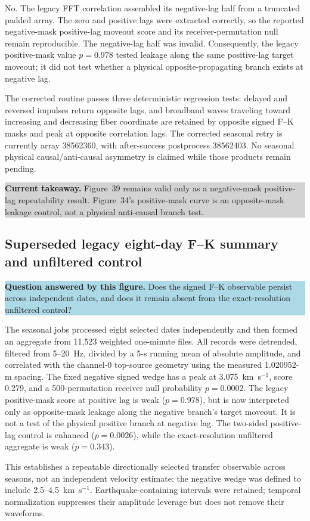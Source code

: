 \documentclass[11pt]{article}
\newcommand{\figquestion}[1]{\par\medskip\noindent\colorbox{lightblue}{\parbox{0.95\linewidth}{\textcolor{questionblue}{\textbf{Question answered by this figure.}} #1}}\par\medskip}
\newcommand{\takeaway}[1]{\par\smallskip\noindent\colorbox{lightgray}{\parbox{0.95\linewidth}{\textbf{Current takeaway.} #1}}\par\medskip}
\begin{document}
No. The legacy FFT correlation assembled its negative-lag half from a truncated padded array. The zero and positive lags were extracted correctly, so the reported negative-mask positive-lag moveout score and its receiver-permutation null remain reproducible. The negative-lag half was invalid. Consequently, the legacy positive-mask value $p=0.978$ tested leakage along the same positive-lag target moveout; it did not test whether a physical opposite-propagating branch exists at negative lag.

The corrected routine passes three deterministic regression tests: delayed and reversed impulses return opposite lags, and broadband waves traveling toward increasing and decreasing fiber coordinate are retained by opposite signed F--K masks and peak at opposite correlation lags. The corrected seasonal retry is currently array 38562360, with after-success postprocess 38562403. No seasonal physical causal/anti-causal asymmetry is claimed while those products remain pending.

\takeaway{Figure~39 remains valid only as a negative-mask positive-lag repeatability result. Figure~34's positive-mask curve is an opposite-mask leakage control, not a physical anti-causal branch test.}


\subsection{Superseded legacy eight-day F--K summary and unfiltered control}
\figquestion{Does the signed F--K observable persist across independent dates, and does it remain absent from the exact-resolution unfiltered control?}

The seasonal jobs processed eight selected dates independently and then formed an aggregate from 11,523 weighted one-minute files. All records were detrended, filtered from 5--20~Hz, divided by a 5-s running mean of absolute amplitude, and correlated with the channel-0 top-source geometry using the measured 1.020952-m spacing. The fixed negative signed wedge has a peak at 3.075~km~s$^{-1}$, score 0.279, and a 500-permutation receiver null probability $p=0.0002$. The legacy positive-mask score at positive lag is weak ($p=0.978$), but is now interpreted only as opposite-mask leakage along the negative branch's target moveout. It is not a test of the physical positive branch at negative lag. The two-sided positive-lag control is enhanced ($p=0.0026$), while the exact-resolution unfiltered aggregate is weak ($p=0.343$).

This establishes a repeatable directionally selected transfer observable across seasons, not an independent velocity estimate: the negative wedge was defined to include 2.5--4.5~km~s$^{-1}$. Earthquake-containing intervals were retained; temporal normalization suppresses their amplitude leverage but does not remove their waveforms.
\end{document}
